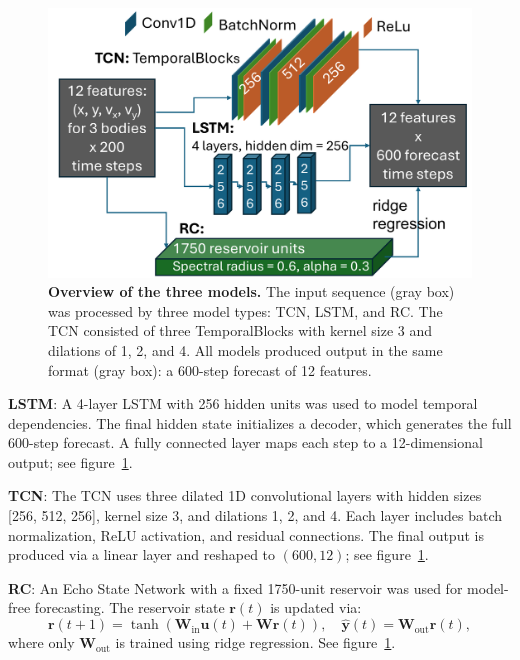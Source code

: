 \documentclass[%
 reprint,
 amsmath,amssymb,
 aps,
]{revtex4-2}
\begin{document}
\begin{figure}
    \centering
    \includegraphics[width=0.99\linewidth]{MethodOverview.png}
    \caption{{\bf Overview of the three models.} The input sequence (gray box) was processed by three model types: TCN, LSTM, and RC. The TCN consisted of three TemporalBlocks with kernel size 3 and dilations of 1, 2, and 4. All models produced output in the same format (gray box): a 600-step forecast of 12 features.}
    \label{fig:methodoverview}
\end{figure}


\textbf{LSTM}:
A 4-layer LSTM with 256 hidden units was used to model temporal dependencies. The final hidden state initializes a decoder, which generates the full 600-step forecast. A fully connected layer maps each step to a 12-dimensional output; see figure~\ref{fig:methodoverview}.

\textbf{TCN}:
The TCN uses three dilated 1D convolutional layers with hidden sizes [256, 512, 256], kernel size 3, and dilations 1, 2, and 4. Each layer includes batch normalization, ReLU activation, and residual connections. The final output is produced via a linear layer and reshaped to $(600, 12)$; see figure~\ref{fig:methodoverview}.

\textbf{RC}:
An Echo State Network with a fixed 1750-unit reservoir was used for model-free forecasting. The reservoir state $\mathbf{r}(t)$ is updated via:
\[
\mathbf{r}(t+1) = \tanh(\mathbf{W}_{\text{in}}\mathbf{u}(t) + \mathbf{W}\mathbf{r}(t)),
\quad
\hat{\mathbf{y}}(t) = \mathbf{W}_{\text{out}}\mathbf{r}(t),
\]
where only $\mathbf{W}_{\text{out}}$ is trained using ridge regression. See figure~\ref{fig:methodoverview}.
\end{document}
